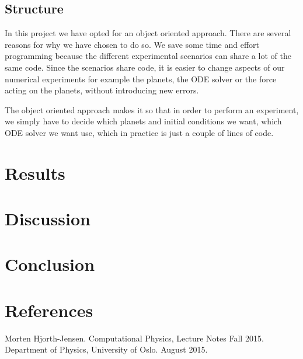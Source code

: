 \documentclass[norsk,a4paper,12pt]{article}
\begin{document}
{\subsection{Structure}
In this project we have opted for an object oriented approach. There are several reasons for why we have chosen to do so. We save some time and effort programming because the different experimental scenarios can share a lot of the same code. Since the scenarios share code, it is easier to change aspects of our numerical experiments for example the planets, the ODE solver or the force acting on the planets, without introducing new errors. 

The object oriented approach makes it so that in order to perform an experiment, we simply have to decide which planets and initial conditions we want, which ODE solver we want use, which in practice is just a couple of lines of code.
\section{Results}
\section{Discussion}
\section{Conclusion}
\section{References}
\begingroup
\renewcommand{\section}[2]{}
\begin{thebibliography}{}
  Morten Hjorth-Jensen.
  Computational Physics, Lecture Notes Fall 2015.
  Department of Physics, University of Oslo.
  August 2015.
\end{thebibliography}
\endgroup
\end{document}
